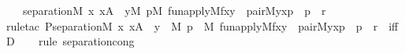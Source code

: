 \begin{isabellebody}
\ \ \ {\isachardoublequoteopen}separation{\isacharparenleft}{\kern0pt}{\isacharhash}{\kern0pt}{\isacharhash}{\kern0pt}M{\isacharcomma}{\kern0pt}\ {\isasymlambda}x{\isachardot}{\kern0pt}\ x{\isasymin}A\ {\isasymlongrightarrow}\ {\isacharparenleft}{\kern0pt}{\isasymexists}y{\isacharbrackleft}{\kern0pt}{\isacharhash}{\kern0pt}{\isacharhash}{\kern0pt}M{\isacharbrackright}{\kern0pt}{\isachardot}{\kern0pt}\ {\isacharparenleft}{\kern0pt}{\isasymexists}p{\isacharbrackleft}{\kern0pt}{\isacharhash}{\kern0pt}{\isacharhash}{\kern0pt}M{\isacharbrackright}{\kern0pt}{\isachardot}{\kern0pt}\ fun{\isacharunderscore}{\kern0pt}apply{\isacharparenleft}{\kern0pt}{\isacharhash}{\kern0pt}{\isacharhash}{\kern0pt}M{\isacharcomma}{\kern0pt}f{\isacharcomma}{\kern0pt}x{\isacharcomma}{\kern0pt}y{\isacharparenright}{\kern0pt}\ {\isasymand}\ pair{\isacharparenleft}{\kern0pt}{\isacharhash}{\kern0pt}{\isacharhash}{\kern0pt}M{\isacharcomma}{\kern0pt}y{\isacharcomma}{\kern0pt}x{\isacharcomma}{\kern0pt}p{\isacharparenright}{\kern0pt}\ {\isasymand}\ p\ {\isasymin}\ r{\isacharparenright}{\kern0pt}{\isacharparenright}{\kern0pt}{\isacharparenright}{\kern0pt}{\isachardoublequoteclose}\isanewline
%
\isadelimproof
\isanewline
\ \ %
\endisadelimproof
%
\isatagproof
{}\isamarkupfalse%
{\isacharparenleft}{\kern0pt}rule{\isacharunderscore}{\kern0pt}tac\ P{\isacharequal}{\kern0pt}{\isachardoublequoteopen}separation{\isacharparenleft}{\kern0pt}{\isacharhash}{\kern0pt}{\isacharhash}{\kern0pt}M{\isacharcomma}{\kern0pt}\ {\isasymlambda}x{\isachardot}{\kern0pt}\ x{\isasymin}A\ {\isasymlongrightarrow}\ {\isacharparenleft}{\kern0pt}{\isasymexists}y\ {\isasymin}\ M{\isachardot}{\kern0pt}\ {\isacharparenleft}{\kern0pt}{\isasymexists}p\ {\isasymin}\ M{\isachardot}{\kern0pt}\ fun{\isacharunderscore}{\kern0pt}apply{\isacharparenleft}{\kern0pt}{\isacharhash}{\kern0pt}{\isacharhash}{\kern0pt}M{\isacharcomma}{\kern0pt}f{\isacharcomma}{\kern0pt}x{\isacharcomma}{\kern0pt}y{\isacharparenright}{\kern0pt}\ {\isasymand}\ pair{\isacharparenleft}{\kern0pt}{\isacharhash}{\kern0pt}{\isacharhash}{\kern0pt}M{\isacharcomma}{\kern0pt}y{\isacharcomma}{\kern0pt}x{\isacharcomma}{\kern0pt}p{\isacharparenright}{\kern0pt}\ {\isasymand}\ p\ {\isasymin}\ r{\isacharparenright}{\kern0pt}{\isacharparenright}{\kern0pt}{\isacharparenright}{\kern0pt}{\isachardoublequoteclose}\ \ iffD{}{\isacharparenright}{\kern0pt}\isanewline
\ \ \ \isamarkupfalse%
{\isacharparenleft}{\kern0pt}rule\ separation{\isacharunderscore}{\kern0pt}cong{\isacharparenright}{\kern0pt}\isanewline

\end{isabellebody}
